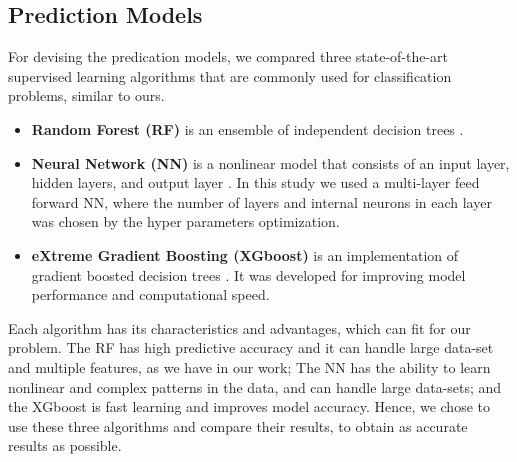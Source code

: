 \subsection{Prediction Models}

For devising the predication models, we compared three state-of-the-art supervised learning algorithms that are commonly used for classification problems, similar to ours.

\begin{itemize}
    \item \textbf{Random Forest (RF)} is an ensemble of independent decision trees \cite{breiman2001random}. %
    \item \textbf{Neural Network (NN)} is a nonlinear model that consists of an input layer, hidden layers, and output layer \cite{bishop1995neural}. %
    In this study we used a multi-layer feed forward NN, where the number of layers and internal neurons in each layer was chosen by the hyper parameters optimization.
    \item \textbf{eXtreme Gradient Boosting (XGboost)} is an implementation of gradient boosted decision trees \cite{chen2016xgboost}. It was developed for improving model performance and computational speed. %
\end{itemize}


Each algorithm has its characteristics and advantages, which can fit for our problem. The RF has high predictive accuracy and it can handle large data-set and multiple features, as we have in our work; The NN has the ability to learn nonlinear and complex patterns in the data, and can handle large data-sets; and the XGboost is fast learning and improves model accuracy. Hence, we chose to use these three algorithms and compare their results, to obtain as accurate results as possible. %


